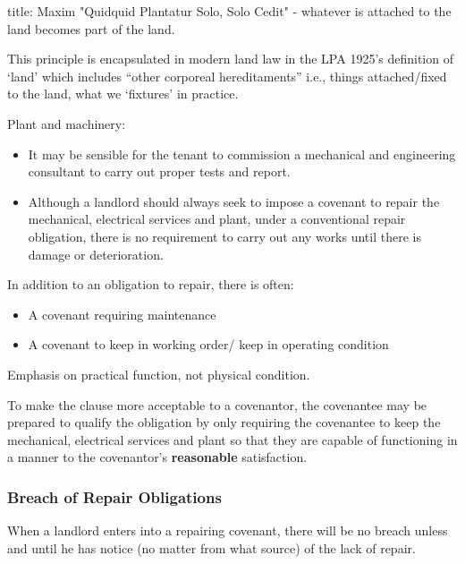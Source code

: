\documentclass[
]{article}
\newenvironment{Shaded}{}{}
\newcommand{\NormalTok}[1]{#1}
\providecommand{\tightlist}{%
  \setlength{\itemsep}{0pt}\setlength{\parskip}{0pt}}
\begin{document}
\begin{Shaded}
\begin{Highlighting}[]
\NormalTok{title: Maxim}
\NormalTok{"Quidquid Plantatur Solo, Solo Cedit" {-} whatever is attached to the land becomes part of the land.}
\end{Highlighting}
\end{Shaded}

This principle is encapsulated in modern land law in the LPA 1925's
definition of `land' which includes ``other corporeal hereditaments''
i.e., things attached/fixed to the land, what we `fixtures' in practice.

Plant and machinery:

\begin{itemize}
\tightlist
\item
  It may be sensible for the tenant to commission a mechanical and
  engineering consultant to carry out proper tests and report.
\item
  Although a landlord should always seek to impose a covenant to repair
  the mechanical, electrical services and plant, under a conventional
  repair obligation, there is no requirement to carry out any works
  until there is damage or deterioration.
\end{itemize}

In addition to an obligation to repair, there is often:

\begin{itemize}
\tightlist
\item
  A covenant requiring maintenance
\item
  A covenant to keep in working order/ keep in operating condition
\end{itemize}

Emphasis on practical function, not physical condition.

To make the clause more acceptable to a covenantor, the covenantee may
be prepared to qualify the obligation by only requiring the covenantee
to keep the mechanical, electrical services and plant so that they are
capable of functioning in a manner to the covenantor's
\textbf{reasonable} satisfaction.

\hypertarget{breach-of-repair-obligations}{%
\subsubsection{Breach of Repair
Obligations}\label{breach-of-repair-obligations}}

When a landlord enters into a repairing covenant, there will be no
breach unless and until he has notice (no matter from what source) of
the lack of repair.
\end{document}
